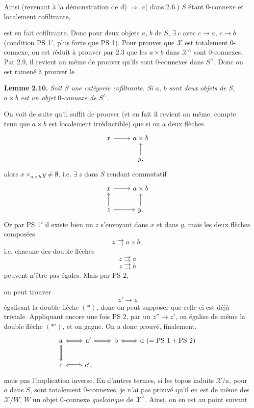 \documentclass[11pt]{article}
\newcommand{\printedpage}[1]{\marginpar{\footnotesize p.~#1}}
\newcommand{\msp}[1]{\marginpar{\footnotesize [#1]}}
\newcommand{\X}{\mathcal{X}}
\begin{document}
Ainsi (revenant à la démonstration de d) $\Longrightarrow$ c) dans 2.6.) $S$ étant 0-connexe et localement cofiltrante,

\msp{page 26} est en fait cofiltrante. Donc pour deux objets $a$, $b$ de $S$, $\exists\ c$ avec $c\longrightarrow a$, $c\longrightarrow b$ (condition PS 1$'$, plus forte que PS 1). Pour prouver que $\X$ est totalement 0-connexe, on est réduit à prouver par 2.3 que les $a\times b$ dans $\X^\wedge$ sont 0-connexes. Par 2.9, il revient au même de prouver qu'ils sont 0-connexes dans $S^\wedge$. Donc on est ramené à prouver le

\textbf{Lemme 2.10.} \textit{Soit $S$ une catégorie cofiltrante. Si $a$, $b$ sont deux objets de $S$, $a\times b$ est un objet} $0$\textit{-connexe de $S^\wedge$.}

On voit de suite qu'il suffit de prouver (et en fait il revient au même, compte tenu que $a\times b$ est localement irréductible) que si on a deux flèches
\[
\begin{tikzcd}
x \arrow[r] & a\times b \\
 & y, \arrow[u]
\end{tikzcd}
\]
alors $x\times_{a\times b}y\neq\emptyset$, i.e. $\exists\ z$ dans $S$ rendant commutatif
\[
\begin{tikzcd}
x \arrow[r] & a\times b \\
z \arrow[u] \arrow[r] & y. \arrow[u]
\end{tikzcd}
\]
Or par PS 1$'$ il existe bien un $z$ s'envoyant dans $x$ et dans $y$, mais les deux flèches composées
\[
z\rightrightarrows a\times b,
\]
i.e. chacune des double flèches
\[
z\rightrightarrows a \tag*{$(*)$}
\]
\[
z\rightrightarrows b \tag*{$(*')$}
\]
peuvent n'être pas égales. Mais par PS 2,

\msp{page 27}on peut trouver
\[
z'\longrightarrow z
\]
\printedpage{17}
égalisant la double flèche $(*)$, donc on peut supposer que celle-ci est déjà triviale. Appliquant encore une fois PS 2, par un $z''\longrightarrow z'$, on égalise de même la double flèche $(*')$, et on gagne. On a donc prouvé, finalement,
\[
\begin{tikzcd}
\mathrm{a} \arrow[r, Leftrightarrow] \arrow[d, Rightarrow] & \mathrm{a}' \arrow[r, Rightarrow] & \mathrm{b} \arrow[r, Leftrightarrow] & \mathrm{d}\ (=\mathrm{PS}\ 1+\mathrm{PS}\ 2) \\
\mathrm{c} \arrow[r, Leftrightarrow] & \mathrm{c}',
\end{tikzcd}
\]
mais pas l'implication inverse. En d'autres termes, si les topos induits $\X/a$, pour $a$ dans $S$, sont totalement 0-connexes, je n'ai pas prouvé qu'il en est de même des $\X/W$, $W$ un objet 0-connexe \textit{quelconque} de $\X^\wedge$. Ainsi, on en est au point suivant
\end{document}
